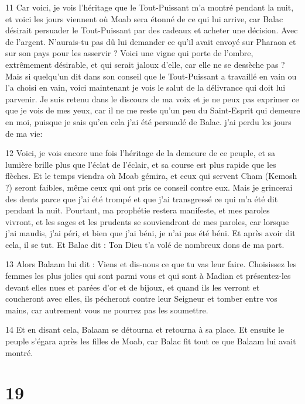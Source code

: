 \par 11 Car voici, je vois l'héritage que le Tout-Puissant m'a montré pendant la nuit, et voici les jours viennent où Moab sera étonné de ce qui lui arrive, car Balac désirait persuader le Tout-Puissant par des cadeaux et acheter une décision. Avec de l'argent. N'aurais-tu pas dû lui demander ce qu'il avait envoyé sur Pharaon et sur son pays pour les asservir ? Voici une vigne qui porte de l'ombre, extrêmement désirable, et qui serait jaloux d'elle, car elle ne se dessèche pas ? Mais si quelqu'un dit dans son conseil que le Tout-Puissant a travaillé en vain ou l'a choisi en vain, voici maintenant je vois le salut de la délivrance qui doit lui parvenir. Je suis retenu dans le discours de ma voix et je ne peux pas exprimer ce que je vois de mes yeux, car il ne me reste qu'un peu du Saint-Esprit qui demeure en moi, puisque je sais qu'en cela j'ai été persuadé de Balac. j'ai perdu les jours de ma vie:

\par 12 Voici, je vois encore une fois l'héritage de la demeure de ce peuple, et sa lumière brille plus que l'éclat de l'éclair, et sa course est plus rapide que les flèches. Et le temps viendra où Moab gémira, et ceux qui servent Cham (Kemosh ?) seront faibles, même ceux qui ont pris ce conseil contre eux. Mais je grincerai des dents parce que j'ai été trompé et que j'ai transgressé ce qui m'a été dit pendant la nuit. Pourtant, ma prophétie restera manifeste, et mes paroles vivront, et les sages et les prudents se souviendront de mes paroles, car lorsque j'ai maudis, j'ai péri, et bien que j'ai béni, je n'ai pas été béni. Et après avoir dit cela, il se tut. Et Balac dit : Ton Dieu t'a volé de nombreux dons de ma part.

\par 13 Alors Balaam lui dit : Viens et dis-nous ce que tu vas leur faire. Choisissez les femmes les plus jolies qui sont parmi vous et qui sont à Madian et présentez-les devant elles nues et parées d'or et de bijoux, et quand ils les verront et coucheront avec elles, ils pécheront contre leur Seigneur et tomber entre vos mains, car autrement vous ne pourrez pas les soumettre.

\par 14 Et en disant cela, Balaam se détourna et retourna à sa place. Et ensuite le peuple s'égara après les filles de Moab, car Balac fit tout ce que Balaam lui avait montré.

\chapter{19}

